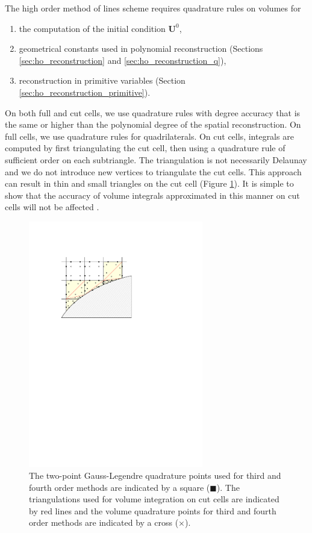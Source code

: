 The high order method of lines scheme requires quadrature rules on volumes for 
\begin{enumerate}
	\item the computation of the initial condition $\mathbf{U}^0$,
	\item geometrical constants used in polynomial reconstruction (Sections \ref{sec:ho_reconstruction} and \ref{sec:ho_reconstruction_q}),
	\item reconstruction in primitive variables (Section \ref{sec:ho_reconstruction_primitive}).
\end{enumerate}
On both full and cut cells,  we use quadrature rules with degree accuracy that is the same or higher than the polynomial degree of the spatial reconstruction.
On full cells, we use quadrature rules for quadrilaterals.  
On cut cells, integrals are computed by first triangulating the cut cell, then using a quadrature rule of sufficient order on each subtriangle.  The triangulation is not necessarily Delaunay and we do not introduce new vertices to triangulate the cut cells.  This approach can result in thin and small triangles on the cut cell (Figure \ref{fig:2dfig_ho_vquad}).  It is simple to show that the accuracy of volume integrals approximated in this manner on cut cells will not be affected \cite{QIN201324}.

\begin{figure}
	\begin{center}
		\includegraphics[width=3.0in]{figs/example_ccmesh_ho_vquad.pdf}
		\caption{\sf 
			The two-point Gauss-Legendre quadrature points used for third and fourth order methods are indicated by a square ($\blacksquare$).  The triangulations used for volume integration on cut cells are indicated by red lines and the volume quadrature points for third and fourth order methods are indicated by a cross ($\times$).} 
		\label{fig:2dfig_ho_vquad}
	\end{center}
\end{figure}


